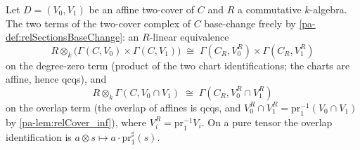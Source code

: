 \begin{definition}
  \label{pa-def:curveDiffTermsBaseChange}
  \leanok

  Let \(D = (V_0, V_1)\) be an affine two-cover of \(C\) and \(R\) a commutative
  \(k\)-algebra. The two terms of the two-cover complex of \(C\) base-change freely by
  \ref{pa-def:relSectionsBaseChange}: an \(R\)-linear equivalence
  \[
    R \otimes_k \bigl(\Gamma(C, V_0) \times \Gamma(C, V_1)\bigr)
    \;\cong\;
    \Gamma(C_R, V_0^R) \times \Gamma(C_R, V_1^R)
  \]
  on the degree-zero term (product of the two chart identifications; the charts are
  affine, hence qcqs), and
  \[
    R \otimes_k \Gamma(C, V_0 \cap V_1) \;\cong\; \Gamma(C_R, V_0^R \cap V_1^R)
  \]
  on the overlap term (the overlap of affines is qcqs, and
  \(V_0^R \cap V_1^R = \mathrm{pr}_1^{-1}(V_0 \cap V_1)\) by \ref{pa-lem:relCover_inf}),
  where \(V_i^R = \mathrm{pr}_1^{-1} V_i\). On a pure tensor the overlap identification
  is \(a \otimes s \mapsto a \cdot \mathrm{pr}_1^\sharp(s)\).
\end{definition}

